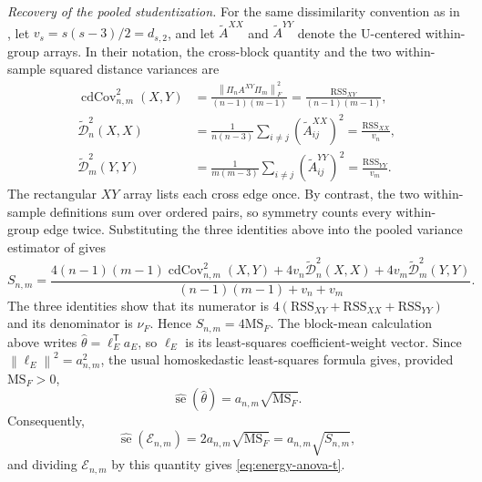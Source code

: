 \documentclass[11pt]{article}
\theoremstyle{plain}
\theoremstyle{definition}
\theoremstyle{remark}
\newcommand{\norm}[1]{\left\lVert #1\right\rVert}
\begin{document}
\smallskip
\noindent\emph{Recovery of the pooled studentization.}
For the same dissimilarity convention as in
\citet{ChakrabortyZhang2021}, let $v_s=s(s-3)/2=d_{s,2}$, and let
$\widetilde A^{XX}$ and $\widetilde A^{YY}$ denote the U-centered
within-group arrays.  In their notation, the cross-block quantity and the two
within-sample squared distance variances are
\begin{align*}
 \operatorname{cdCov}_{n,m}^2(X,Y)
 &=\frac{\norm{\Pi_nA^{XY}\Pi_m}_F^2}{(n-1)(m-1)}
   =\frac{\mathrm{RSS}_{XY}}{(n-1)(m-1)},\\
 \widetilde{\mathcal D}_n^2(X,X)
 &=\frac{1}{n(n-3)}\sum_{i\ne j}(\widetilde A^{XX}_{ij})^2
   =\frac{\mathrm{RSS}_{XX}}{v_n},\\
 \widetilde{\mathcal D}_m^2(Y,Y)
 &=\frac{1}{m(m-3)}\sum_{i\ne j}(\widetilde A^{YY}_{ij})^2
   =\frac{\mathrm{RSS}_{YY}}{v_m}.
\end{align*}
The rectangular $XY$ array lists each cross edge once.  By contrast, the two
within-sample definitions sum over ordered pairs, so symmetry counts every
within-group edge twice.  Substituting the three identities above into the
pooled variance estimator of \citet{ChakrabortyZhang2021} gives
\begin{equation}
 S_{n,m}
 =\frac{4(n-1)(m-1)\operatorname{cdCov}_{n,m}^2(X,Y)
          +4v_n\widetilde{\mathcal D}_n^2(X,X)
          +4v_m\widetilde{\mathcal D}_m^2(Y,Y)}
         {(n-1)(m-1)+v_n+v_m}.
 \label{eq:cz-pooled-variance}
\end{equation}
The three identities show that its numerator is
$4(\mathrm{RSS}_{XY}+\mathrm{RSS}_{XX}+\mathrm{RSS}_{YY})$ and its
denominator is $\nu_F$.  Hence $S_{n,m}=4\mathrm{MS}_F$.
The block-mean calculation above writes
$\widehat\theta=\ell_E^\mathsf Ta_E$, so $\ell_E$ is its least-squares
coefficient-weight vector.  Since $\norm{\ell_E}^2=a_{n,m}^2$, the usual
homoskedastic least-squares formula gives, provided $\mathrm{MS}_F>0$,
\[
 \widehat{\operatorname{se}}(\widehat\theta)
 =a_{n,m}\sqrt{\mathrm{MS}_F}.
\]
Consequently,
\[
 \widehat{\operatorname{se}}(\mathcal E_{n,m})
 =2a_{n,m}\sqrt{\mathrm{MS}_F}
 =a_{n,m}\sqrt{S_{n,m}},
\]
and dividing $\mathcal E_{n,m}$ by this quantity gives
\eqref{eq:energy-anova-t}.
\end{document}
